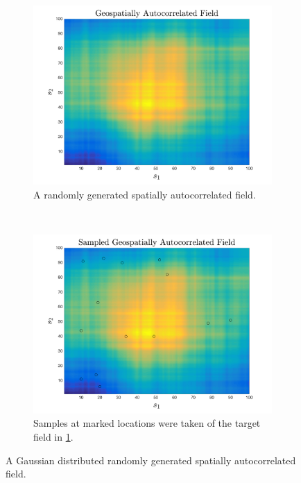 \begin{figure}[ht!]
    \centering
    \begin{subfigure}[t]{0.5\textwidth}
        \centering
        \includegraphics[width=\linewidth]{figures/generated_field.png}
        \captionsetup{skip=0.5\baselineskip,size=footnotesize}
        \ssp
        \caption{A randomly generated spatially autocorrelated field.}
		\label{fig:gen_field}
    \end{subfigure}%
    ~ 
    \begin{subfigure}[t]{0.5\textwidth}
        \centering
        \includegraphics[width=\linewidth]{figures/sampled_generated_field.png}
		\captionsetup{skip=0.5\baselineskip,size=footnotesize}
		\ssp
        \caption{Samples at marked locations were taken of the target field in \ref{fig:gen_field}.}
		\label{fig:sampled_field}
    \end{subfigure}
    \ssp
    \caption{A Gaussian distributed randomly generated spatially autocorrelated field.}
    \label{fig:generated_and_sampled_field}
\end{figure}

